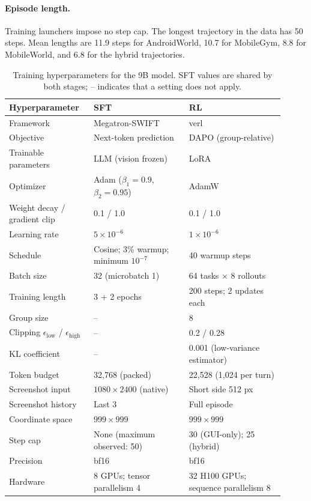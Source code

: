 \paragraph{Episode length.}
Training launchers impose no step cap. The longest trajectory in the data has 50 steps. Mean lengths are 11.9 steps for AndroidWorld, 10.7 for MobileGym, 8.8 for MobileWorld, and 6.8 for the hybrid trajectories.

\begin{table}[H]
\centering
\small
\caption{Training hyperparameters for the 9B model. SFT values are shared by both stages; -- indicates that a setting does not apply.}
\label{tab:app-hparams}
\setlength{\tabcolsep}{3pt}
\begin{tabular}{p{0.27\linewidth}p{0.32\linewidth}p{0.32\linewidth}}
\toprule
Hyperparameter & SFT & RL \\
\midrule
Framework & Megatron-SWIFT & verl \\
Objective & Next-token prediction & DAPO (group-relative) \\
Trainable parameters & LLM (vision frozen) & LoRA \\
Optimizer & Adam ($\beta_1{=}0.9$, $\beta_2{=}0.95$) & AdamW \\
Weight decay / gradient clip & 0.1 / 1.0 & 0.1 / 1.0 \\
Learning rate & $5\times10^{-6}$ & $1\times10^{-6}$ \\
Schedule & Cosine; 3\% warmup; minimum $10^{-7}$ & 40 warmup steps \\
Batch size & 32 (microbatch 1) & 64 tasks $\times$ 8 rollouts \\
Training length & 3 + 2 epochs & 200 steps; 2 updates each \\
Group size & -- & 8 \\
Clipping $\epsilon_{\text{low}}$ / $\epsilon_{\text{high}}$ & -- & 0.2 / 0.28 \\
KL coefficient & -- & 0.001 (low-variance estimator) \\
Token budget & 32,768 (packed) & 22,528 (1,024 per turn) \\
Screenshot input & $1080\times2400$ (native) & Short side 512 px \\
Screenshot history & Last 3 & Full episode \\
Coordinate space & $999\times999$ & $999\times999$ \\
Step cap & None (maximum observed: 50) & 30 (GUI-only); 25 (hybrid) \\
Precision & bf16 & bf16 \\
Hardware & 8 GPUs; tensor parallelism 4 & 32 H100 GPUs; sequence parallelism 8 \\
\bottomrule
\end{tabular}
\end{table}

